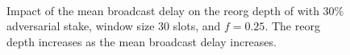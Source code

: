 \begin{figure}[htbp!]
\\
\caption{Impact of the mean broadcast delay on the reorg depth of \ProjBase with 30\% adversarial stake, window size 30 slots, and $f=0.25$. The reorg depth increases as the mean broadcast delay increases.}
\label{fig:window}
\end{figure}

